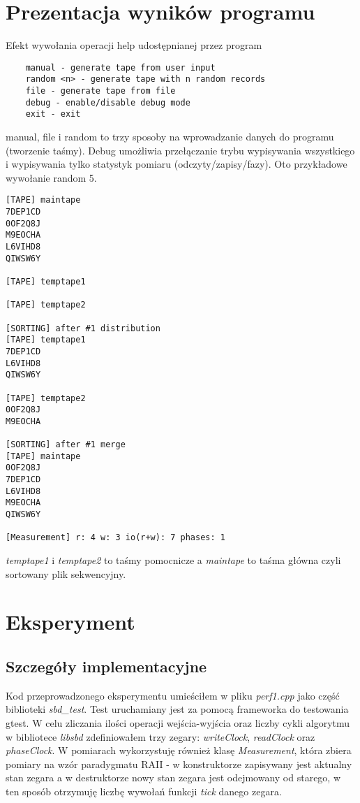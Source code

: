 \documentclass{article}
\begin{document}
\section{Prezentacja wyników programu}
Efekt wywołania operacji help udostępnianej przez program
\begin{lstlisting}
	manual - generate tape from user input
	random <n> - generate tape with n random records
	file - generate tape from file
	debug - enable/disable debug mode
	exit - exit
\end{lstlisting}
manual, file i random to trzy sposoby na wprowadzanie danych do programu (tworzenie taśmy). Debug umożliwia
przełączanie trybu wypisywania wszystkiego i wypisywania tylko statystyk pomiaru (odczyty/zapisy/fazy).  Oto 
przykładowe wywołanie random 5.
\begin{lstlisting}
[TAPE] maintape
7DEP1CD
0OF2Q8J
M9EOCHA
L6VIHD8
QIWSW6Y

[TAPE] temptape1

[TAPE] temptape2

[SORTING] after #1 distribution 
[TAPE] temptape1
7DEP1CD
L6VIHD8
QIWSW6Y

[TAPE] temptape2
0OF2Q8J
M9EOCHA

[SORTING] after #1 merge 
[TAPE] maintape
0OF2Q8J
7DEP1CD
L6VIHD8
M9EOCHA
QIWSW6Y

[Measurement] r: 4 w: 3 io(r+w): 7 phases: 1
\end{lstlisting}
\textit{temptape1} i \textit{temptape2} to taśmy pomocnicze a \textit{maintape} to taśma główna czyli sortowany plik sekwencyjny.
\section{Eksperyment}
\subsection{Szczegóły implementacyjne}
Kod przeprowadzonego eksperymentu umieściłem w pliku \textit{perf1.cpp} jako część biblioteki \textit{sbd\_test}. Test uruchamiany jest za pomocą frameworka do
testowania gtest. W celu zliczania ilości operacji wejścia-wyjścia oraz liczby cykli algorytmu w bibliotece \textit{libsbd} zdefiniowałem trzy zegary: 
\textit{writeClock}, \textit{readClock} oraz \textit{phaseClock}. W pomiarach wykorzystuję również klasę \textit{Measurement}, która zbiera pomiary na wzór paradygmatu RAII - w 
konstruktorze zapisywany jest aktualny stan zegara a w destruktorze nowy stan zegara jest odejmowany od starego, w ten sposób otrzymuję liczbę
wywołań funkcji \textit{tick} danego zegara.
\end{document}
